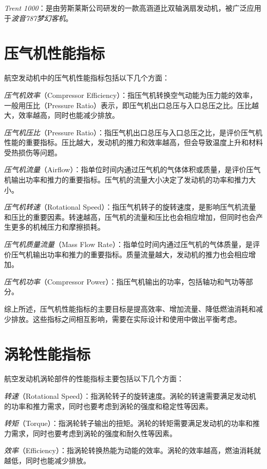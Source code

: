 \documentclass{MyLatex}
\begin{document}
\emph{Trent 1000}：是由劳斯莱斯公司研发的一款高涵道比双轴涡扇发动机，被广泛应用于\emph{波音787梦幻客机}。

\section{压气机性能指标}

航空发动机中的压气机性能指标包括以下几个方面：

\emph{压气机效率}（Compressor Efficiency）：指压气机转换空气动能为压力能的效率，一般用压比（Pressure Ratio）表示，即压气机出口总压与入口总压之比。压比越大，效率越高，同时也能减少排放。

\emph{压气机压比}（Pressure Ratio）：指压气机出口总压与入口总压之比，是评价压气机性能的重要指标。压比越大，发动机的推力和效率越高，但会导致温度上升和材料受热损伤等问题。

\emph{压气机流量}（Airflow）：指单位时间内通过压气机的气体体积或质量，是评价压气机输出功率和推力的重要指标。压气机的流量大小决定了发动机的功率和推力大小。

\emph{压气机转速}（Rotational Speed）：指压气机转子的旋转速度，是影响压气机流量和压比的重要因素。转速越高，压气机的流量和压比也会相应增加，但同时也会产生更多的机械压力和摩擦损耗。

\emph{压气机质量流量}（Mass Flow Rate）：指单位时间内通过压气机的气体质量，是评价压气机输出功率和推力的重要指标。质量流量越大，发动机的推力也会相应增加。

\emph{压气机功率}（Compressor Power）：指压气机输出的功率，包括轴功和气功等部分。

综上所述，压气机性能指标的主要目标是提高效率、增加流量、降低燃油消耗和减少排放。这些指标之间相互影响，需要在实际设计和使用中做出平衡考虑。

\section{涡轮性能指标}

航空发动机涡轮部件的性能指标主要包括以下几个方面：

\emph{转速}（Rotational Speed）：指涡轮转子的旋转速度。涡轮的转速需要满足发动机的功率和推力需求，同时也要考虑到涡轮的强度和稳定性等因素。

\emph{转矩}（Torque）：指涡轮转子输出的扭矩。涡轮的转矩需要满足发动机的功率和推力需求，同时也要考虑到涡轮的强度和耐久性等因素。

\emph{效率}（Efficiency）：指涡轮转换热能为动能的效率。涡轮的效率越高，燃油消耗就越低，同时也能减少排放。
\end{document}
